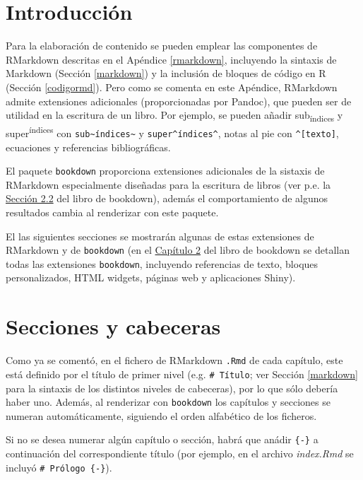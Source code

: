 \documentclass[]{book}
\theoremstyle{definition}
\theoremstyle{definition}
\theoremstyle{definition}
\theoremstyle{remark}
\begin{document}
\section{Introducción}\label{introduccion}

Para la elaboración de contenido se pueden emplear las componentes de
RMarkdown descritas en el Apéndice \ref{rmarkdown}, incluyendo la
sintaxis de Markdown (Sección \ref{markdown}) y la inclusión de bloques
de código en R (Sección \ref{codigormd}). Pero como se comenta en este
Apéndice, RMarkdown admite extensiones adicionales (proporcionadas por
Pandoc), que pueden ser de utilidad en la escritura de un libro. Por
ejemplo, se pueden añadir sub\textsubscript{índices} y
super\textsuperscript{índices} con
\texttt{sub\textasciitilde{}índices\textasciitilde{}} y
\texttt{super\^{}índices\^{}}, notas al pie con
\texttt{\^{}{[}texto{]}}, ecuaciones y referencias bibliográficas.

El paquete \texttt{bookdown} proporciona extensiones adicionales de la
sistaxis de RMarkdown especialmente diseñadas para la escritura de
libros (ver p.e. la
\href{https://bookdown.org/yihui/bookdown/markdown-extensions-by-bookdown.html}{Sección
2.2} del libro de bookdown), además el comportamiento de algunos
resultados cambia al renderizar con este paquete.

El las siguientes secciones se mostrarán algunas de estas extensiones de
RMarkdown y de \texttt{bookdown} (en el
\href{https://bookdown.org/yihui/bookdown/markdown-extensions-by-bookdown.html}{Capítulo
2} del libro de bookdown se detallan todas las extensiones
\texttt{bookdown}, incluyendo referencias de texto, bloques
personalizados, HTML widgets, páginas web y aplicaciones Shiny).

\section{Secciones y cabeceras}\label{secciones-y-cabeceras}

Como ya se comentó, en el fichero de RMarkdown \texttt{.Rmd} de cada
capítulo, este está definido por el título de primer nivel (e.g.
\texttt{\#\ Título}; ver Sección \ref{markdown} para la sintaxis de los
distintos niveles de cabeceras), por lo que sólo debería haber uno.
Además, al renderizar con \texttt{bookdown} los capítulos y secciones se
numeran automáticamente, siguiendo el orden alfabético de los ficheros.

Si no se desea numerar algún capítulo o sección, habrá que anádir
\texttt{\{-\}} a continuación del correspondiente título (por ejemplo,
en el archivo \emph{index.Rmd} se incluyó \texttt{\#\ Prólogo\ \{-\}}).
\end{document}
